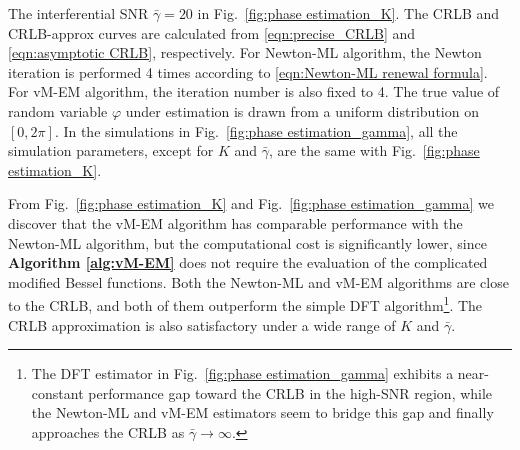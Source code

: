 \documentclass[journal,twocolumn]{IEEEtran}
\theoremstyle{nonumberplain}
\begin{document}
    The interferential SNR $\bar{\gamma}=20$ in Fig.~\ref{fig:phase estimation_K}. 
    The CRLB and CRLB-approx curves are calculated from \eqref{eqn:precise_CRLB} and \eqref{eqn:asymptotic CRLB}, respectively. 
    For Newton-ML algorithm, the Newton iteration is performed 4 times according to \eqref{eqn:Newton-ML renewal formula}. 
    For vM-EM algorithm, the iteration number is also fixed to 4. The true value of random variable $\varphi$ under estimation is drawn from a uniform distribution on $[0,2\pi]$. 
    In the simulations in Fig.~\ref{fig:phase estimation_gamma}, all the simulation parameters, except for $K$ and $\bar{\gamma}$, are the same with Fig.~\ref{fig:phase estimation_K}.

    From Fig.~\ref{fig:phase estimation_K} and Fig.~\ref{fig:phase estimation_gamma} we discover that the vM-EM algorithm has comparable performance with the Newton-ML algorithm, but the computational cost is significantly lower, since {\bf Algorithm \ref{alg:vM-EM}} does not require the evaluation of the complicated modified Bessel functions. 
    Both the Newton-ML and vM-EM algorithms are close to the CRLB, and both of them outperform the simple DFT algorithm\footnote{The DFT estimator in Fig.~\ref{fig:phase estimation_gamma} exhibits a near-constant performance gap toward the CRLB in the high-SNR region, while the Newton-ML and vM-EM estimators seem to bridge this gap and finally approaches the CRLB as $\bar{\gamma}\to\infty$.}. 
    The CRLB approximation is also satisfactory under a wide range of $K$ and $\bar{\gamma}$. 
\end{document}
